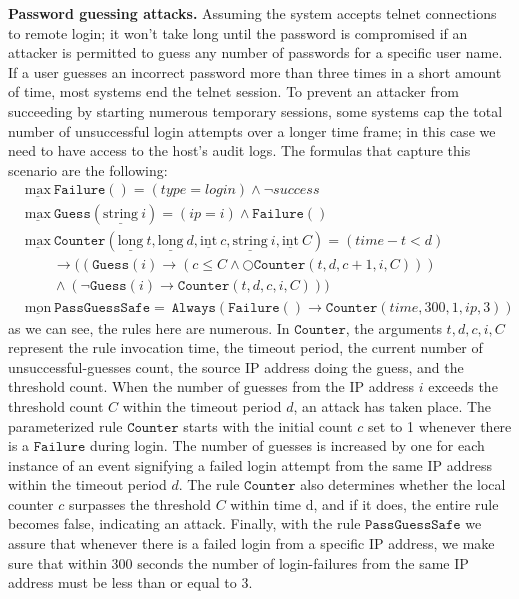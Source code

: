 \documentclass[english]{article}
\begin{document}
\textbf{Password guessing attacks.}
Assuming the system accepts telnet connections to remote login; it won't take long until the password is compromised if an attacker is permitted to guess any number of passwords for a specific user name. If a user guesses an incorrect password more than three times in a short amount of time, most systems end the telnet session. To prevent an attacker from succeeding by starting numerous temporary sessions, some systems cap the total number of unsuccessful login attempts over a longer time frame; in this case we need to have access to the host's audit logs. The formulas that capture this scenario are the following:
\begin{align*}
    & \underline{\text{max}}\ \mathtt{Failure}() = (type=login)\land \neg success\\
    & \underline{\text{max}}\ \mathtt{Guess}(\underline{\text{string}}\ i) = (ip=i)\land \mathtt{Failure}()\\
    & \underline{\text{max}}\ \mathtt{Counter}(\underline{\text{long}}\ t, \underline{\text{long}}\ d, \underline{\text{int}}\ c,\underline{\text{string}}\ i,\underline{\text{int}}\ C) = (time-t<d)\\
    & \quad\quad\rightarrow((\mathtt{Guess}(i)\rightarrow(c\leq C\land \bigcirc\mathtt{Counter}(t,d,c+1,i,C)))  \\
    & \quad\quad\land(\neg \mathtt{Guess}(i)\rightarrow\mathtt{Counter}(t,d,c,i,C))) \\
    & \underline{\text{mon}}\ \mathtt{PassGuessSafe} =\ \mathtt{Always}(\mathtt{Failure}()\rightarrow\mathtt{Counter}(time,300,1,ip,3)) 
\end{align*}
as we can see, the rules here are numerous. In $\mathtt{Counter}$, the arguments $t, d, c, i, C$ represent the rule invocation time, the timeout period, the current number of unsuccessful-guesses count, the source IP address doing the guess, and the threshold count. When the number of guesses from the IP address $i$ exceeds the threshold count $C$ within the timeout period $d$, an attack has taken place. The parameterized rule $\mathtt{Counter}$ starts with the initial count $c$ set to 1 whenever there is a $\mathtt{Failure}$ during login. The number of guesses is increased by one for each instance of an event signifying a failed login attempt from the same IP address within the timeout period $d$. The rule $\mathtt{Counter}$ also determines whether the local counter $c$ surpasses the threshold $C$ within time d, and if it does, the entire rule becomes false, indicating an attack. Finally, with the rule $\mathtt{PassGuessSafe}$ we assure that whenever there is a failed login from a specific IP address, we make sure that within $300$ seconds the number of login-failures from the same IP address must be less than or equal to $3$.
\end{document}
